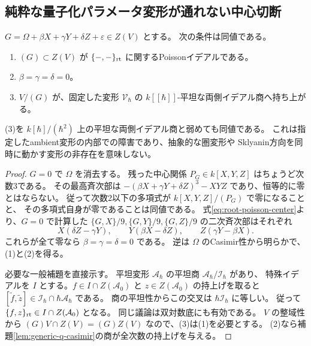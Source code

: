 \subsection{純粋な量子化パラメータ変形が通れない中心切断}
\begin{theorem}[非Casimir切断の一次平坦持上げ障害]
\label{thm:poisson-cut-obstruction}
$G=\Omega+\beta X+\gamma Y+\delta Z+\varepsilon\in Z(V)$ とする。
次の条件は同値である。
\begin{enumerate}
\item $(G)\subset Z(V)$ が $\{-,-\}_{\rm rt}$ に関するPoissonイデアルである。
\item $\beta=\gamma=\delta=0$。
\item $V/(G)$ が、固定した変形 $\mathcal V_\hbar$ の
$k[[\hbar]]$-平坦な両側イデアル商へ持ち上がる。
\end{enumerate}
(3)を $k[\hbar]/(\hbar^2)$ 上の平坦な両側イデアル商と弱めても同値である。
これは指定したambient変形の内部での障害であり、抽象的な圏変形や
Sklyanin方向を同時に動かす変形の非存在を意味しない。
\end{theorem}
\begin{proof}
$G=0$ で $\Omega$ を消去する。
残った中心関係 $P_G\in k[X,Y,Z]$ はちょうど次数3である。
その最高斉次部は
$-(\beta X+\gamma Y+\delta Z)^3-XYZ$ であり、恒等的に零とはならない。
従って次数2以下の多項式が $k[X,Y,Z]/(P_G)$ で零になることと、
その多項式自身が零であることは同値である。
式\eqref{eq:root-poisson-center}より、$G=0$ で計算した
$\{G,X\}/9,\{G,Y\}/9,\{G,Z\}/9$ の二次斉次部はそれぞれ
\begin{equation}\label{eq:cut-leading-obstructions}
 X(\delta Z-\gamma Y),\qquad
 Y(\beta X-\delta Z),\qquad
 Z(\gamma Y-\beta X).
\end{equation}
これらが全て零なら $\beta=\gamma=\delta=0$ である。
逆は $\Omega$ のCasimir性から明らかで、(1)と(2)を得る。

必要な一般補題を直接示す。
平坦変形 $\mathcal A_\hbar$ の平坦商 $\mathcal A_\hbar/\mathcal I_\hbar$ があり、
特殊イデアルを $I$ とする。$f\in I\cap Z(\mathcal A_0)$ と
$z\in Z(\mathcal A_0)$ の持上げを取ると
$[\widetilde f,\widetilde z]\in\mathcal I_\hbar\cap\hbar\mathcal A_\hbar$ である。
商の平坦性からこの交叉は $\hbar\mathcal I_\hbar$ に等しい。
従って $\{f,z\}_{\rm rt}\in I\cap Z(\mathcal A_0)$ となる。
同じ議論は双対数底にも有効である。
$V$ の整域性から $(G)V\cap Z(V)=(G)Z(V)$ なので、(3)は(1)を必要とする。
(2)なら補題\ref{lem:generic-q-casimir}の商が全次数の持上げを与える。
\end{proof}

